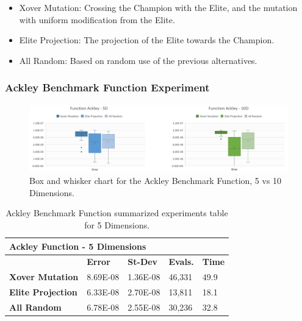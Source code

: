 \documentclass[graybox]{svmult}
\begin{document}
\begin{itemize}
    \item   Xover Mutation:      Crossing the Champion with the Elite, and the mutation with uniform modification from the Elite.
    \item   Elite Projection:    The projection of the Elite towards the Champion. 
    \item   All Random:          Based on random use of the previous alternatives.
\end{itemize}

\subsubsection{Ackley Benchmark Function Experiment}

\begin{figure}
    \includegraphics[width=\textwidth]{img/fig_fun_ackley.pdf}
    \caption{Box and whisker chart for the Ackley Benchmark Function, 5 vs 10 Dimensions.} \label{fig.fun_ackley}
    \end{figure}

\begin{table}[]
    \scriptsize
    \centering
    \caption{Ackley Benchmark Function summarized experiments table for 5 Dimensions.}\label{tab.fun_ackley5}
    \begin{tabular}{@{}lllll@{}}
    \toprule
    \multicolumn{5}{l}{\textbf{Ackley Function - 5 Dimensions}} \\ \midrule
     & \textbf{Error} & \textbf{St-Dev} & \textbf{Evals.} & \textbf{Time} \\
    \textbf{Xover Mutation} & 8.69E-08 & 1.36E-08 & 46,331 & 49.9 \\
    \textbf{Elite Projection} & 6.33E-08 & 2.70E-08 & 13,811 & 18.1 \\
    \textbf{All Random} & 6.78E-08 & 2.55E-08 & 30,236 & 32.8 \\ \bottomrule
    \end{tabular}
    \end{table}
\end{document}
